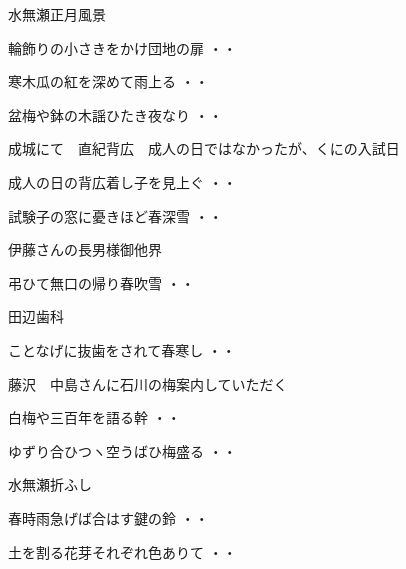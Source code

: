 \vspace{0.6cm}
水無瀬正月風景
\begin{shiika}輪飾りの小さきをかけ団地の扉
\hfill{・・}\end{shiika}
\begin{shiika}寒木瓜の紅を深めて雨上る
\hfill{・・}\end{shiika}
\begin{shiika}盆梅や鉢の木謡ひたき夜なり
\hfill{・・}\end{shiika}
\vspace{0.6cm}
成城にて　直紀背広　成人の日ではなかったが、くにの入試日
\begin{shiika}成人の日の背広着し子を見上ぐ
\hfill{・・}\end{shiika}
\begin{shiika}試験子の窓に憂きほど春深雪
\hfill{・・}\end{shiika}
\vspace{0.6cm}
伊藤さんの長男様御他界
\begin{shiika}弔ひて無口の帰り春吹雪
\hfill{・・}\end{shiika}
\vspace{0.6cm}
田辺歯科
\begin{shiika}ことなげに抜歯をされて春寒し
\hfill{・・}\end{shiika}
\vspace{0.6cm}
藤沢　中島さんに石川の梅案内していただく
\begin{shiika}白梅や三百年を語る幹
\hfill{・・}\end{shiika}
\begin{shiika}ゆずり合ひつヽ空うばひ梅盛る
\hfill{・・}\end{shiika}
\vspace{0.6cm}
水無瀬折ふし
\begin{shiika}春時雨急げば合はす鍵の鈴
\hfill{・・}\end{shiika}
\begin{shiika}土を割る花芽それぞれ色ありて
\hfill{・・}\end{shiika}
